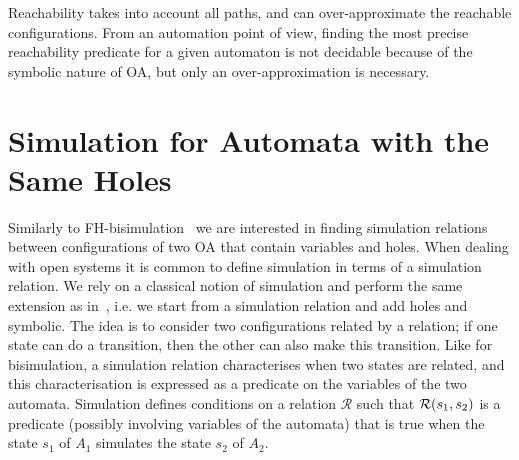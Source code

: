 \documentclass[runningheads]{llncs}
\begin{document}
Reachability takes into account all paths, and can over-approximate the reachable configurations. 
From an automation point of view, finding the most precise reachability predicate for a given automaton is not decidable because of the symbolic nature of OA, but only an over-approximation is necessary.


\section{Simulation  for Automata with the Same Holes}\label{sec:refinement}

Similarly to FH-bisimulation~\cite{AMHEEMA:2023} we are interested  in finding simulation relations between configurations of two OA that contain variables and holes. When dealing with open systems it is common to define simulation in terms of a simulation relation.
We rely on a classical notion of simulation and perform the same extension as in~\cite{AMHEEMA:2023}, i.e. we start from a simulation relation and add holes and symbolic. The idea is to consider two configurations related by a relation; if one state can do a transition, then the other can also make this transition. 
Like for bisimulation, a simulation relation characterises when two states are related, and this  characterisation is expressed as a predicate on the variables of the two automata.
Simulation defines conditions on a relation $\mathcal{R}$ such that $\mathcal{R}{\left(s_1, s_2\right)}$ is a predicate (possibly involving variables of the automata) that is true when the state $s_1$ of $A_1$ simulates the state $s_2$ of $A_2$.



%
\end{document}
